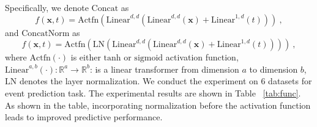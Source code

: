 Specifically, we denote $\text{Concat}$ as
\begin{equation}
f(\textbf{x}, t)=\text{Actfn}(\text{Linear}^{d, d}(\text{Linear}^{d, d}(\textbf{x}) + \text{Linear}^{1, d}(t))) ~,
\end{equation}
and $\text{ConcatNorm}$ as
\begin{equation}
f(\textbf{x}, t)=\text{Actfn}(\text{LN}(\text{Linear}^{d, d}(\text{Linear}^{d, d}(\textbf{x}) + \text{Linear}^{1, d}(t)))) ~, 
\end{equation}
where $\text{Actfn}(\cdot)$ is either $\text{tanh}$ or $\text{sigmoid}$ activation function, $\text{Linear}^{a,b}(\cdot): \mathbb{R}^a \rightarrow \mathbb{R}^b$: is a linear transformer from dimension $a$ to dimension $b$, $\text{LN}$ denotes the layer normalization. We conduct the experiment on 6 datasets for event prediction task. The experimental results are shown in Table ~\ref{tab:func}. As shown in the table, incorporating normalization before the activation function leads to improved predictive performance.

